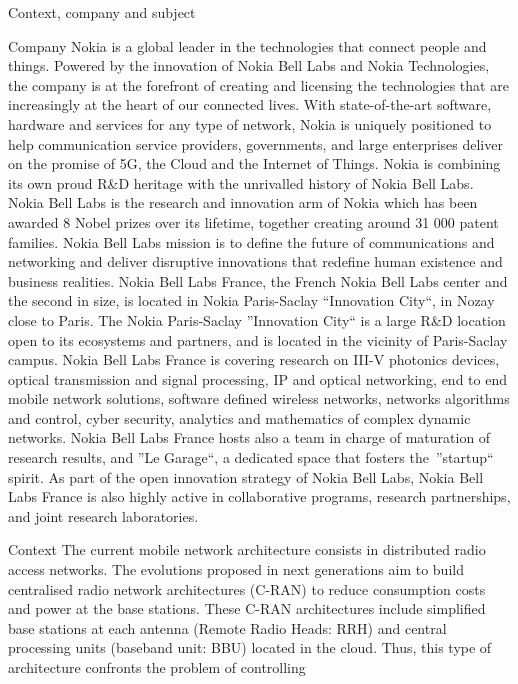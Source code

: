 \documentclass[a4paper,10pt]{report}
\begin{document}
\begin{chapter}{Context, company and subject}
\begin{section}{Company}
Nokia is a global leader in the technologies that connect people and things. Powered by the innovation of Nokia Bell Labs and Nokia Technologies, the company is at the forefront of creating and licensing the technologies that are increasingly at the heart of our connected lives. With state-of-the-art software, hardware and services for any type of network, Nokia is uniquely positioned to help communication service providers, governments, and large enterprises deliver on the promise of 5G, the Cloud and the Internet of Things. Nokia is combining its own proud R\&D heritage with the unrivalled history of Nokia Bell Labs. Nokia Bell Labs is the research and innovation arm of Nokia which has been awarded 8 Nobel prizes over its lifetime, together creating around 31 000 patent families. Nokia Bell Labs mission is to define the future of communications and networking and deliver disruptive innovations that redefine human existence and business realities.
Nokia Bell Labs France, the French Nokia Bell Labs center and the second in size, is located in Nokia Paris-Saclay ``Innovation City``, in Nozay close to Paris. The Nokia Paris-Saclay ''Innovation City`` is a large R\&D location open to its ecosystems and partners, and is located in the vicinity of Paris-Saclay campus. Nokia Bell Labs France is covering research on III-V photonics devices, optical transmission and signal processing, IP and optical networking, end to end mobile network solutions, software defined wireless networks, networks algorithms and control, cyber security, analytics and mathematics of complex dynamic networks. Nokia Bell Labs France hosts also a team in charge of maturation of research results, and ''Le Garage``, a dedicated space that fosters the ''startup`` spirit. As part of the open innovation strategy of Nokia Bell Labs, Nokia Bell Labs France is also highly active in collaborative programs, research partnerships, and joint research laboratories.
\end{section}
\begin{section}{Context}
The current mobile network architecture consists in distributed radio access networks.
The evolutions proposed in next generations aim to build centralised radio network architectures (C-RAN) to reduce consumption costs 
and power at the base stations. These C-RAN architectures include simplified base stations at each antenna (Remote Radio Heads: RRH) 
and central processing units (baseband unit: BBU) located in the cloud. Thus, this type of architecture confronts the problem of controlling 

\end{section}
\end{chapter}
\end{document}
